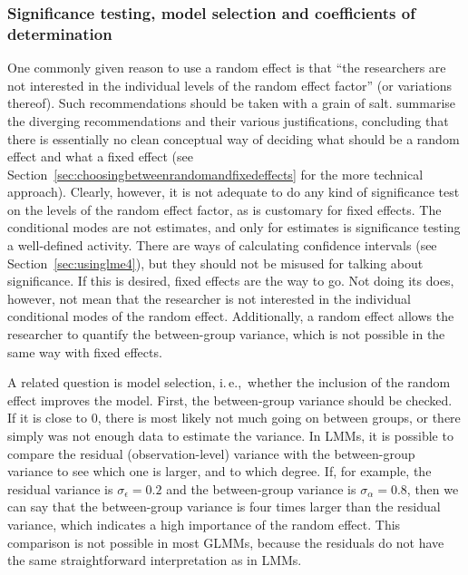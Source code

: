 \documentclass[a4paper,12pt]{article}
\newcommand{\ie}{i.\,e.,\ }
\begin{document}
\subsubsection{Significance testing, model selection and coefficients of determination}
\label{sec:significancetestingandcoefficientsofdetermination}

One commonly given reason to use a random effect is that ``the researchers are not interested in the individual levels of the random effect factor'' (or variations thereof).
Such recommendations should be taken with a grain of salt.
\citet[245--247]{GelmanHill2006} summarise the diverging recommendations and their various justifications, concluding that there is essentially no clean conceptual way of deciding what should be a random effect and what a fixed effect (see Section~\ref{sec:choosingbetweenrandomandfixedeffects} for the more technical approach).
Clearly, however, it is not adequate to do any kind of significance test on the levels of the random effect factor, as is customary for fixed effects.
The conditional modes are not estimates, and only for estimates is significance testing a well-defined activity.
There are ways of calculating confidence intervals (see Section~\ref{sec:usinglme4}), but they should not be misused for talking about significance.
If this is desired, fixed effects are the way to go.
Not doing its does, however, not mean that the researcher is not interested in the individual conditional modes of the random effect.
Additionally, a random effect allows the researcher to quantify the between-group variance, which is not possible in the same way with fixed effects.

A related question is model selection, \ie whether the inclusion of the random effect improves the model.
First, the between-group variance should be checked.
If it is close to $0$, there is most likely not much going on between groups, or there simply was not enough data to estimate the variance.
In LMMs, it is possible to compare the residual (observation-level) variance with the between-group variance to see which one is larger, and to which degree.
If, for example, the residual variance is $\sigma_{\epsilon}=0.2$ and the between-group variance is $\sigma_{\alpha}=0.8$, then we can say that the between-group variance is four times larger than the residual variance, which indicates a high importance of the random effect.
This comparison is not possible in most GLMMs, because the residuals do not have the same straightforward interpretation as in LMMs.
\end{document}
